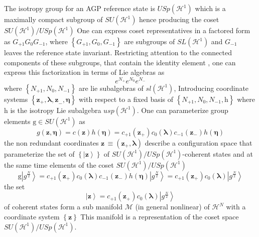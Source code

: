 \documentclass[aps,preprint]{revtex4}%
\begin{document}
The isotropy group for an AGP reference state is $USp\left(  \mathcal{H}%
^{1}\right)  $ which is a maximally compact subgroup of $SU\left(
\mathcal{H}^{1}\right)  $ hence producing the coset $SU\left(  \mathcal{H}%
^{1}\right)  /USp\left(  \mathcal{H}^{1}\right)  $ One can express coset
representatives in a factored form as $G_{+1}G_{0}G_{-1}$, where $\left\{
G_{+1},G_{0},G_{-1}\right\}  $ are subgroups of $SL\left(  \mathcal{H}%
^{1}\right)  $ and $G_{-1}$ leaves the reference state invariant. Restricting
attention to the connected components of these subgroups, that contain the
identity element , one can express this factorization in terms of Lie algebras
as
\begin{equation}
e^{N_{+}}e^{N_{0}}e^{N_{-}}%
\end{equation}
where $\left\{  N_{+1},N_{0},N_{-1}\right\}  $ are lie subalgebras of
$sl\left(  \mathcal{H}^{1}\right)  $, Introducing coordinate systems $\left\{
\mathbf{z}_{+},\mathbf{\lambda,z}_{-},\mathbf{\eta}\right\}  $ with respect to
a fixed basis of $\left\{  N_{+1},N_{0},N_{-1},\mathrm{h}\right\}  $ where
$\mathrm{h}$ is the isotropy Lie subalgebra $usp\left(  \mathcal{H}%
^{1}\right)  $. One can parameterize group elements $\mathrm{g}\in SU\left(
\mathcal{H}^{1}\right)  $ as
\begin{equation}
g\left(  \mathbf{z,\eta}\right)  =c\left(  \mathbf{z}\right)  h\left(
\mathbf{\eta}\right)  =c_{+1}\left(  \mathbf{z}_{+}\right)  c_{0}\left(
\mathbf{\lambda}\right)  c_{-1}\left(  \mathbf{z}_{-}\right)  h\left(
\mathbf{\eta}\right)
\end{equation}
the non redundant coordinates $\mathbf{z}\,\equiv\left(  \mathbf{z}%
_{+},\mathbf{\lambda}\right)  $ describe a configuration space that
parameterize the set of $\left\{  \left\vert \mathbf{z}\right\rangle \right\}
$ of $SU\left(  \mathcal{H}^{1}\right)  /USp\left(  \mathcal{H}^{1}\right)
$-coherent states and at the same time elements of the coset $SU\left(
\mathcal{H}^{1}\right)  /USp\left(  \mathcal{H}^{1}\right)  $
\begin{equation}
\mathrm{g}\left\vert g^{\frac{N}{2}}\right\rangle =c_{+1}\left(
\mathbf{z}_{+}\right)  c_{0}\left(  \mathbf{\lambda}\right)  c_{-1}\left(
\mathbf{z}_{-}\right)  h\left(  \mathbf{\eta}\right)  \left\vert g^{\frac
{N}{2}}\right\rangle =c_{+1}\left(  \mathbf{z}_{+}\right)  c_{0}\left(
\mathbf{\lambda}\right)  \left\vert g^{\frac{N}{2}}\right\rangle
\end{equation}
the set%
\begin{equation}
\left\vert \mathbf{z}\right\rangle =c_{+1}\left(  \mathbf{z}_{+}\right)
c_{0}\left(  \mathbf{\lambda}\right)  \left\vert g^{\frac{N}{2}}\right\rangle
\end{equation}
of coherent states form a sub manifold $\mathcal{M}$ (in general nonlinear) of
$\mathcal{H}^{N}$ with a coordinate system $\left\{  \mathbf{z}\right\}  $
This manifold is a representation of the coset space $SU\left(  \mathcal{H}%
^{1}\right)  /USp\left(  \mathcal{H}^{1}\right)  .$
\end{document}

